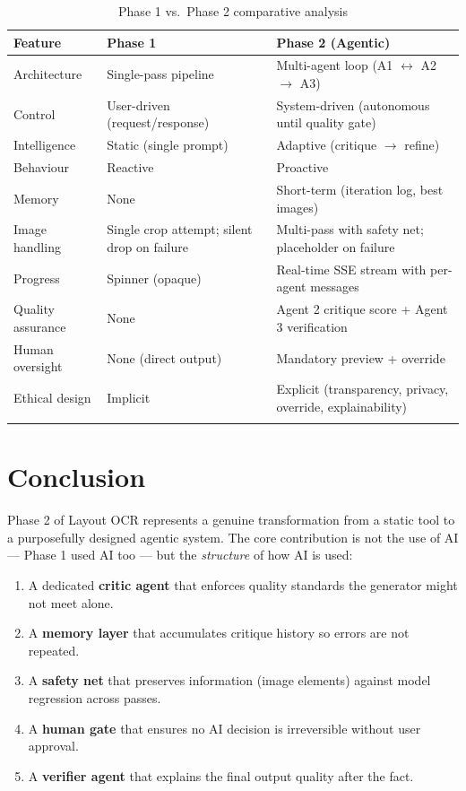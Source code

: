 \documentclass[12pt,a4paper]{article}
\begin{document}
\begin{center}
\begin{longtable}{lp{5cm}p{5.5cm}}
  \toprule
  \textbf{Feature} & \textbf{Phase 1} & \textbf{Phase 2 (Agentic)} \\
  \midrule
  Architecture    & Single-pass pipeline & Multi-agent loop (A1 $\leftrightarrow$ A2 $\rightarrow$ A3) \\
  Control         & User-driven (request/response) & System-driven (autonomous until quality gate) \\
  Intelligence    & Static (single prompt) & Adaptive (critique $\rightarrow$ refine) \\
  Behaviour       & Reactive & Proactive \\
  Memory          & None & Short-term (iteration log, best images) \\
  Image handling  & Single crop attempt; silent drop on failure & Multi-pass with safety net; placeholder on failure \\
  Progress        & Spinner (opaque) & Real-time SSE stream with per-agent messages \\
  Quality assurance & None & Agent 2 critique score + Agent 3 verification \\
  Human oversight & None (direct output) & Mandatory preview + override \\
  Ethical design  & Implicit & Explicit (transparency, privacy, override, explainability) \\
  \bottomrule
  \caption{Phase 1 vs.\ Phase 2 comparative analysis}
\end{longtable}
\end{center}


\section{Conclusion}

Phase 2 of Layout OCR represents a genuine transformation from a static tool to a purposefully
designed agentic system. The core contribution is not the use of AI — Phase 1 used AI too —
but the \emph{structure} of how AI is used:

\begin{enumerate}[noitemsep]
  \item A dedicated \textbf{critic agent} that enforces quality standards the generator might
    not meet alone.
  \item A \textbf{memory layer} that accumulates critique history so errors are not repeated.
  \item A \textbf{safety net} that preserves information (image elements) against model
    regression across passes.
  \item A \textbf{human gate} that ensures no AI decision is irreversible without user
    approval.
  \item A \textbf{verifier agent} that explains the final output quality after the fact.
\end{enumerate}
\end{document}
